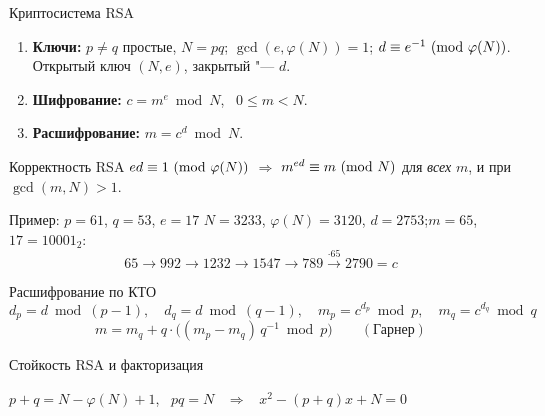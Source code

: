 \documentclass{ca-slides}
\begin{document}
\begin{canvasframe}{Криптосистема RSA}
  \small
  \begin{enumerate}
    \item \textbf{Ключи:} $p \ne q$ простые, $N = pq$; $\gcd(e, \varphi(N)) = 1$;
      $d \equiv e^{-1} \ (\mathrm{mod}\ \varphi(N))$. Открытый ключ $(N, e)$, закрытый "--- $d$.
    \item \textbf{Шифрование:} $c = m^e \bmod N$, \ $0 \le m < N$.
    \item \textbf{Расшифрование:} $m = c^d \bmod N$.
  \end{enumerate}
\end{canvasframe}

\begin{theoremframe}{Корректность RSA}
  $ed \equiv 1 \ (\mathrm{mod}\ \varphi(N))$ $\Rightarrow$ $m^{ed} \equiv m \ (\mathrm{mod}\ N)$ для \emph{всех} $m$,
  и при $\gcd(m, N) > 1$.
\end{theoremframe}

\begin{canvasframe}{Пример: $p = 61$, $q = 53$, $e = 17$}
  \small
  $N = 3233$, $\varphi(N) = 3120$, $d = 2753$;\quad $m = 65$, $17 = 10001_2$:
  \[65 \to 992 \to 1232 \to 1547 \to 789 \xrightarrow{\cdot 65} 2790 = c\]
  \penspace[0.35\textheight]
\end{canvasframe}

\begin{canvasframe}{Расшифрование по КТО}
  \small
  \[
    d_p = d \bmod (p - 1),\quad d_q = d \bmod (q - 1),\quad m_p = c^{d_p} \bmod p,\quad
    m_q = c^{d_q} \bmod q
  \]
  \[
    m = m_q + q \cdot \bigl((m_p - m_q)\, q^{-1} \bmod p\bigr) \qquad (\text{Гарнер})
  \]
  \penspace[0.25\textheight]
\end{canvasframe}

\begin{canvasframe}{Стойкость RSA и факторизация}
  \centering\small
  \par\medskip\raggedright
  $p + q = N - \varphi(N) + 1$, \ $pq = N$ \ $\Rightarrow$ \ $x^2 - (p + q)x + N = 0$
\end{canvasframe}
\end{document}
